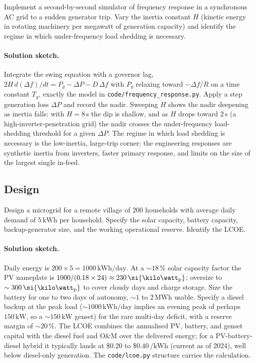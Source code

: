 \begin{exercise}
Implement a second-by-second simulator of frequency response in a
synchronous AC grid to a sudden generator trip. Vary the
inertia constant $H$ (kinetic energy in rotating machinery per
megawatt of generation capacity) and identify the regime in which
under-frequency load shedding is necessary.
\paragraph{Solution sketch.}
Integrate the swing equation with a governor lag, $2H\,d(\Delta f)/dt =
P_g - \Delta P - D\,\Delta f$ with $P_g$ relaxing toward $-\Delta f/R$
on a time constant $T_g$, exactly the model in
\texttt{code/frequency\_response.py}. Apply a step generation loss
$\Delta P$ and record the nadir. Sweeping $H$ shows the nadir deepening
as inertia falls: with $H = 8\,\si{\second}$ the dip is shallow, and as
$H$ drops toward $2\,\si{\second}$ (a high-inverter-penetration grid)
the nadir crosses the under-frequency load-shedding threshold for a
given $\Delta P$. The regime in which load shedding is necessary is the
low-inertia, large-trip corner; the engineering responses are synthetic
inertia from inverters, faster primary response, and limits on the size
of the largest single in-feed.
\end{exercise}

\subsection*{Design}

\begin{exercise}
Design a microgrid for a remote village of $200$ households with
average daily demand of $5\,\si{\kilo\watt\hour}$ per household.
Specify the solar capacity, battery capacity, backup-generator size,
and the working operational reserve. Identify the LCOE.
\paragraph{Solution sketch.}
Daily energy is $200\times5 = 1000\,\si{\kilo\watt\hour}/\text{day}$.
At a $\sim 18\,\%$ solar capacity factor the PV nameplate is $1000/
(0.18\times24) \approx 230\,\si{\kilo\watt\textsubscript{p}}$; oversize
to $\sim 300\,\si{\kilo\watt\textsubscript{p}}$ to cover cloudy days and
charge storage. Size the battery for one to two days of autonomy,
$\sim 1$ to $2\,\si{\mega\watt\hour}$ usable. Specify a diesel backup at
the peak load ($\sim 1000\,\si{\kilo\watt\hour}/\text{day}$ implies an
evening peak of perhaps $150\,\si{\kilo\watt}$, so a $\sim 150\,\si{\kilo
\watt}$ genset) for the rare multi-day deficit, with a reserve margin of
$\sim 20\,\%$. The LCOE combines the annualised PV, battery, and genset
capital with the diesel fuel and O\&M over the delivered energy; for a
PV-battery-diesel hybrid it typically lands at $\$0.20$ to $\$0.40\,\si{
\per\kilo\watt\hour}$ (current as of 2024), well below diesel-only
generation. The \texttt{code/lcoe.py} structure carries the calculation.
\end{exercise}


